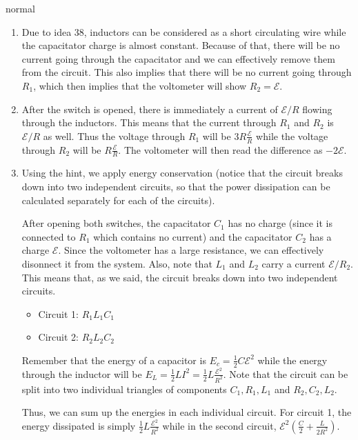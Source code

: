 \begin{solution}{normal}
\begin{enumerate}[label = (\alph*)]
\item Due to idea 38, inductors can be considered as a short circulating wire while the capacitator charge is almost constant. Because of that, there will be no current going through the capacitator and we can effectively remove them from the circuit. This also implies that there will be no current going through $R_1$, which then implies that the voltometer will show $R_2 = \boxed{\mathcal{E}}$.

\item After the switch is opened, there is immediately a current of $\mathcal{E}/R$ flowing through the inductors. This means that the current through $R_1$ and $R_2$ is $\mathcal{E}/R$ as well. Thus the voltage through $R_1$ will be $3R\frac{\mathcal{E}}{R}$ while the voltage through $R_2$ will be $R\frac{\mathcal{E}}{R}$. The voltometer will then read the difference as $-2\mathcal{E}$.

\item Using the hint, we apply energy conservation (notice that the circuit breaks down into two independent circuits, so that the power dissipation can be calculated separately for each of the circuits).

After opening both switches, the capacitator $C_1$ has no charge (since it is connected to $R_1$ which contains no current) and the capacitator $C_2$ has a charge $\mathcal{E}$. Since the voltometer has a large resistance, we can effectively disonnect it from the system. Also, note that $L_1$ and $L_2$ carry a current $\mathcal{E}/R_2$. This means that, as we said, the circuit breaks down into two independent circuits. 
\begin{itemize}
\item Circuit 1: $R_1L_1C_1$
\item Circuit 2: $R_2L_2C_2$
\end{itemize}
Remember that the energy of a capacitor is $E_c = \frac{1}{2}C\mathcal{E}^2$ while the energy through the inductor will be $E_{L} = \frac{1}{2}LI^2 = \frac{1}{2}L\frac{\mathcal{E}^2}{R^2}$. Note that the circuit can be split into two individual triangles of components $C_1, R_1, L_1$ and $R_2, C_2, L_2$. 

Thus, we can sum up the energies in each individual circuit. For circuit 1, the energy dissipated is simply $\frac{1}{2}L\frac{\mathcal{E}^2}{R^2}$ while in the second circuit, $\mathcal{E}^2 \left(\frac{C}{2} + \frac{L}{2R^2}\right)$. 
\end{enumerate}
\end{solution}